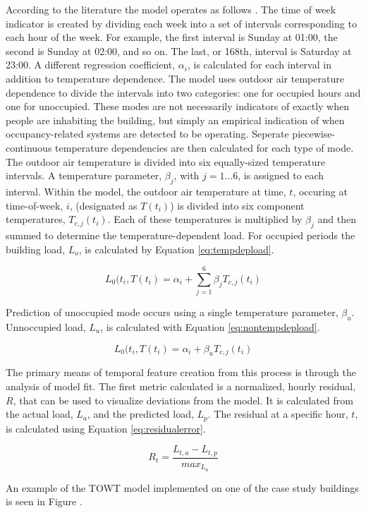 According to the literature the model operates as follows \cite{price_methods_2010}. The time of week indicator is created by dividing each week into a set of intervals corresponding to each hour of the week. For example, the first interval is Sunday at 01:00, the second is Sunday at 02:00, and so on. The last, or 168th, interval is Saturday at 23:00. A different regression coefficient, $\alpha_i$, is calculated for each interval in addition to temperature dependence. The model uses outdoor air temperature dependence to divide the intervals into two categories: one for occupied hours and one for unoccupied. These modes are not necessarily indicators of exactly when people are inhabiting the building, but simply an empirical indication of when occupancy-related systems are detected to be operating. Seperate piecewise-continuous temperature dependencies are then calculated for each type of mode. The outdoor air temperature is divided into six equally-sized temperature intervals. A temperature parameter, $\beta_j$, with $j = 1...6$, is assigned to each interval. Within the model, the outdoor air temperature at time, $t$, occuring at time-of-week, $i$, (designated as $T(t_i)$) is divided into six component temperatures, $T_{c,j}(t_i)$. Each of these temperatures is multiplied by $\beta_j$ and then summed to determine the temperature-dependent load. For occupied periods the building load, $L_o$, is calculated by Equation \ref{eq:tempdepload}.

\begin{equation}
\label{eq:tempdepload}
L_0(t_i,T(t_i) = \alpha_i + \sum_{j=1}^{6}\beta_j T_{c,j}(t_i)
\end{equation}

Prediction of unoccupied mode occurs using a single temperature parameter, $\beta_u$. Unnoccupied load, $L_u$, is calculated with Equation \ref{eq:nontempdepload}.

\begin{equation}
\label{eq:nontempdepload}
L_0(t_i,T(t_i) = \alpha_i + \beta_u T_{c,j}(t_i)
\end{equation}

The primary means of temporal feature creation from this process is through the analysis of model fit. The first metric calculated is a normalized, hourly residual, $R$, that can be used to visualize deviations from the model. It is calculated from the actual load, $L_a$, and the predicted load, $L_p$. The residual at a specific hour, $t$, is calculated using Equation \ref{eq:residualerror}.

\begin{equation}
\label{eq:residualerror}
R_t = \frac{L_{t,a} - L_{t,p}}{max_{L_a}}
\end{equation}

An example of the TOWT model implemented on one of the case study buildings is seen in Figure . 